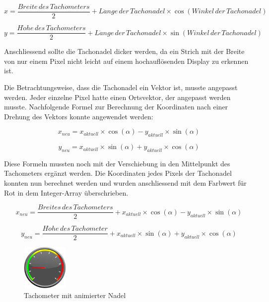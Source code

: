 \begin{equation}
	x = \frac{Breite\, des\, Tachometers}{2} + L\ddot{a}nge\, der\, Tachonadel \times \cos(Winkel\, der\, Tachonadel)
\end{equation}

\begin{equation}
	y = \frac{H\ddot{o}he\, des\, Tachometers}{2} + L\ddot{a}nge\, der\, Tachonadel \times \sin(Winkel\, der\, Tachonadel)
\end{equation}

Anschliessend sollte die Tachonadel dicker werden, da ein Strich mit der Breite von nur einem Pixel nicht leicht auf einem hochauflösenden Display zu erkennen ist.

Die Betrachtungsweise, dass die Tachonadel ein Vektor ist, musste angepasst werden. Jeder einzelne Pixel hatte einen Ortsvektor, der angepasst werden musste. Nachfolgende Formel zur Berechnung der Koordinaten nach einer Drehung des Vektors konnte angewendet werden:

\begin{equation}
	x_{neu} = x_{aktuell} \times \cos(\alpha) - y_{aktuell} \times \sin(\alpha)
\end{equation}

\begin{equation}
	y_{neu} = x_{aktuell} \times \sin(\alpha) + y_{aktuell} \times \cos(\alpha)
\end{equation}

Diese Formeln mussten noch mit der Verschiebung in den Mittelpunkt des Tachometers ergänzt werden. Die Koordinaten jedes Pixels der Tachonadel konnten nun berechnet werden und wurden anschliessend mit dem Farbwert für Rot in dem Integer-Array überschrieben.

\begin{equation}
	x_{neu} = \frac{Breites\,des\,Tachometers}{2} + x_{aktuell} \times \cos(\alpha) - y_{aktuell} \times \sin(\alpha)
\end{equation}

\begin{equation}
	y_{neu} = \frac{H\ddot{o}he\,des\,Tachometer}{2} + x_{aktuell} \times \sin(\alpha) + y_{aktuell} \times \cos(\alpha)
\end{equation}

\begin{figure}[ht]
    \includegraphics[width=0.2\textwidth]{3Vorgehen/imag/tachometer_mit_nadel.png}
    \caption{Tachometer mit animierter Nadel}
	\label{tachometer_mit_nadel} 
\end{figure}


